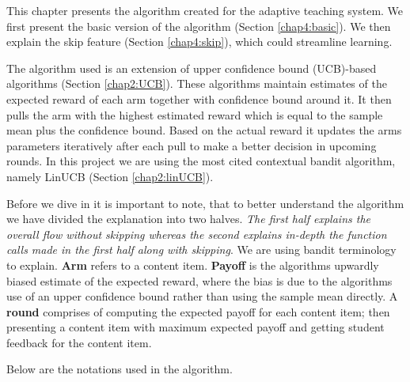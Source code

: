 \label{chapter:algorithm}

This chapter presents the algorithm created for the adaptive teaching system. We first present the basic version of the algorithm (Section \ref{chap4:basic}). We then explain the skip feature (Section \ref{chap4:skip}), which could streamline learning. \par

The algorithm used is an extension of upper confidence bound (UCB)-based algorithms \cite{auer2002finite} (Section \ref{chap2:UCB}). These algorithms maintain estimates of the expected reward of each arm together with confidence bound around it. It then pulls the arm with the highest estimated reward which is equal to the sample mean plus the confidence bound. Based on the actual reward it updates the arms parameters iteratively after each pull to make a better decision in upcoming rounds. In this project we are using the most cited contextual bandit algorithm, namely LinUCB (Section \ref{chap2:linUCB}).  \par

Before we dive in it is important to note, that to better understand the algorithm we have divided the explanation into two halves. \textit{The first half explains the overall flow without skipping whereas the second explains in-depth the function calls made in the first half along with skipping}. We are using bandit terminology to explain. \textbf{Arm} refers to a content item. \textbf{Payoff} is the algorithms upwardly biased estimate of the expected reward, where the bias is due to the algorithms use of an upper confidence bound rather than using the sample mean directly. A \textbf{round} comprises of computing the expected payoff for each content item; then presenting a content item with maximum expected payoff and getting student feedback for the content item. \par

Below are the notations used in the algorithm.

